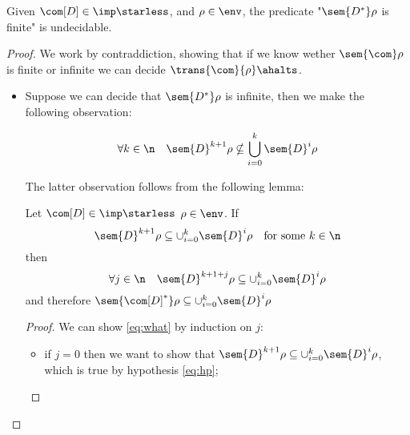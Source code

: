 \begin{lemma}\label{le:infiniteness}
  Given \(\com[D]\in\imp\starless\), and \(\rho \in \env\), the
  predicate "\(\sem{D^*}\rho\) is finite" is undecidable.
\end{lemma}

\begin{proof}
  We work by contraddiction, showing that if we know wether
  \(\sem{\com}\rho\) is finite or infinite we can decide
  \(\trans{\com}{\rho}\ahalts\).
  \begin{itemize}
  \item Suppose we can decide that \(\sem{D^*}\rho\) is infinite, then
    we make the following observation:
    \begin{observation}\label{obs:noncontained}
      \begin{equation*}
        \forall k \in \n \quad \sem{D}^{k+1}\rho \nsubseteq \bigcup_{i=0}^k\sem{D}^i\rho
      \end{equation*} 
    \end{observation}
    The latter observation follows from the following lemma:
    \begin{lemma}\label{le:contain}
      Let \(\com[D] \in \imp\starless\) \(\rho \in \env\). If
      \begin{equation}\label{eq:hp}
        \sem{D}^{k+1}\rho \subseteq \cup_{i=0}^k\sem{D}^i\rho \quad \text{for some } k \in \n
      \end{equation}
      then
      \begin{equation}\label{eq:what}
        \forall j \in \n \quad \sem{D}^{k+1+j}\rho \subseteq \cup_{i=0}^k\sem{D}^i\rho
      \end{equation}
      and therefore
      \(\sem{\com[D]^*}\rho \subseteq \cup_{i=0}^k\sem{D}^i\rho\)
    \end{lemma}
    \begin{proof}
      We can show \eqref{eq:what} by induction on \(j\):
      \begin{itemize}
      \item if \(j=0\) then we want to show that
        \(\sem{D}^{k+1}\rho \subseteq \cup_{i=0}^k\sem{D}^i\rho\), which is
        true by hypothesis \eqref{eq:hp};
        

\end{itemize}
\end{proof}
\end{itemize}
\end{proof}
